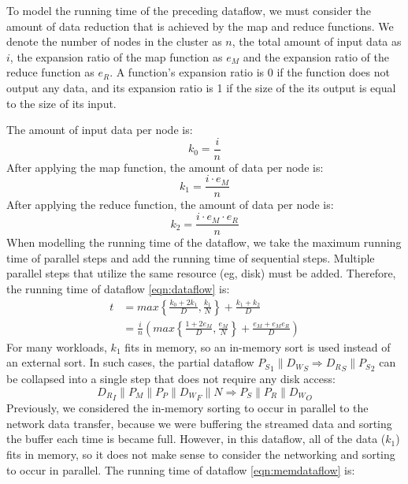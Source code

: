 \documentclass{acm_proc_article-sp}
\begin{document}
To model the running time of the preceding dataflow, we must consider the amount of data reduction that is achieved by the map and reduce functions. We denote the number of nodes in the cluster as $n$, the total amount of input data as $i$, the  expansion ratio of the map function as $e_M$ and the expansion ratio of the reduce function as $e_R$. A function's expansion ratio is 0 if the function does not output any data, and its expansion ratio is 1 if the size of the its output is equal to the size of its input.

The amount of input data per node is:
\begin{equation}
k_0 = \frac{i}{n}
\end{equation}
After applying the map function, the amount of data per node is:
\begin{equation}
k_1 = \frac{i \cdot e_M}{n}
\end{equation}
After applying the reduce function, the amount of data per node is:
\begin{equation}
k_2 = \frac{i \cdot e_M \cdot e_R}{n}
\end{equation}
When modelling the running time of the dataflow, we take the maximum running time of parallel steps and add the running time of sequential steps. Multiple parallel steps that utilize the same resource (eg, disk) must be added. Therefore, the running time of dataflow \ref{eqn:dataflow} is:
\begin{align}
t &= max\left\{ \frac{k_0 + 2k_1}{D}, \frac{k_1}{N} \right\} + \frac{k_1 + k_2}{D}\\
  &= \frac{i}{n} \left( max\left\{ \frac{1 + 2 e_M}{D}, \frac{e_M}{N} \right\} + \frac{e_M + e_M e_R}{D} \right)
\label{eqn:runtime}
\end{align}
For many workloads, $k_1$ fits in memory, so an in-memory sort is used instead of an external sort. In such cases, the partial dataflow ${P_{S}}_1 \| {D_{W}}_S \Rightarrow {D_{R}}_S \| {P_{S}}_2$ can be collapsed into a single step that does not require any disk access:
\begin{equation}
{D_{R}}_I \| P_{M} \| P_{P} \|
{D_{W}}_F \| N \Rightarrow P_{S} \|
P_{R} \| {D_{W}}_O
\label{eqn:memdataflow}
\end{equation}
Previously, we considered the in-memory sorting to occur in parallel to the network data transfer, because we were buffering the streamed data and sorting the buffer each time is became full. However, in this dataflow, all of the data ($k_1$) fits in memory, so it does not make sense to consider the networking and sorting to occur in parallel. The running time of dataflow \ref{eqn:memdataflow} is:
\end{document}
